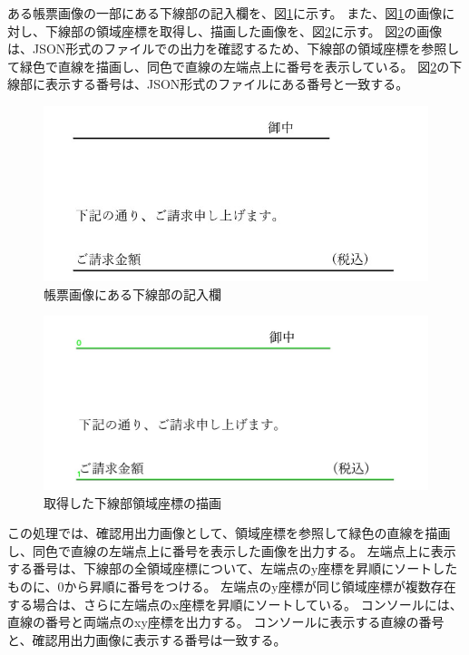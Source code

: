ある帳票画像の一部にある下線部の記入欄を、図\ref{fig:underline_original}に示す。
また、図\ref{fig:underline_original}の画像に対し、下線部の領域座標を取得し、描画した画像を、図\ref{fig:underline_drawing}に示す。
図\ref{fig:underline_drawing}の画像は、JSON形式のファイルでの出力を確認するため、下線部の領域座標を参照して緑色で直線を描画し、同色で直線の左端点上に番号を表示している。
図\ref{fig:underline_drawing}の下線部に表示する番号は、JSON形式のファイルにある番号と一致する。

\begin{figure}[t]
  \begin{center}
      \includegraphics[width=15cm]{image/03-function/underline_original.jpg}
      \caption{帳票画像にある下線部の記入欄}
      \label{fig:underline_original}
  \end{center}
\end{figure}

\begin{figure}[t]
  \begin{center}
      \includegraphics[width=15cm]{image/03-function/underline_drawing.jpg}
      \caption{取得した下線部領域座標の描画}
      \label{fig:underline_drawing}
  \end{center}
\end{figure}



この処理では、確認用出力画像として、領域座標を参照して緑色の直線を描画し、同色で直線の左端点上に番号を表示した画像を出力する。
左端点上に表示する番号は、下線部の全領域座標について、左端点のy座標を昇順にソートしたものに、0から昇順に番号をつける。
左端点のy座標が同じ領域座標が複数存在する場合は、さらに左端点のx座標を昇順にソートしている。
コンソールには、直線の番号と両端点のxy座標を出力する。
コンソールに表示する直線の番号と、確認用出力画像に表示する番号は一致する。


